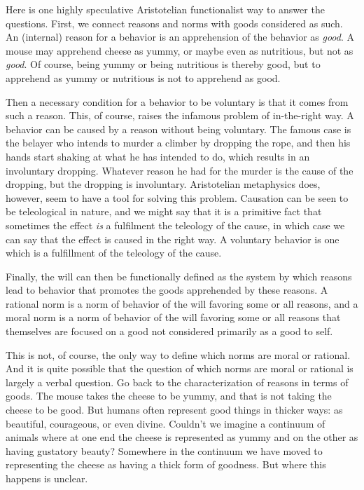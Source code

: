 Here is one highly speculative Aristotelian functionalist way to answer the questions. First, we connect reasons and norms with goods
considered as such. An (internal) reason 
for a behavior is an apprehension of the behavior as \textit{good}. A mouse may apprehend cheese as yummy, or maybe even as nutritious, 
but not as \textit{good}. Of course, being yummy or being nutritious is thereby good, but to apprehend as yummy or nutritious is not 
to apprehend as good. 

Then a necessary condition for a behavior to be voluntary is that it 
comes from such a reason. This, of course, raises the infamous problem of in-the-right way. A behavior can be caused by a reason
without being voluntary. The famous case is the belayer who intends to murder a climber by dropping the rope, and then
his hands start shaking at what he has intended to do, which results in an involuntary dropping. Whatever reason he had
for the murder is the cause of the dropping, but the dropping is involuntary. Aristotelian metaphysics does, however, seem
to have a tool for solving this problem. Causation can be seen to be teleological in nature, and we might say that it is 
a primitive fact that sometimes the effect \textit{is} a fulfilment the teleology of the cause, in which case we can say that the effect 
is caused in the right way. A voluntary behavior is one which is a fulfillment of the teleology of the cause.

Finally, the will can then be functionally defined as the system by which reasons lead to behavior that promotes 
the goods apprehended by these reasons. A rational norm is a norm of behavior
of the will favoring some or all reasons, and a moral norm is a norm of behavior of the will favoring some or all reasons that themselves 
are focused on  a good not considered primarily as a good to self. 

This is not, of course, the only way to define which norms are moral or rational. And it is quite possible that the question of which
norms are moral or rational is largely a verbal question. Go back to the characterization of reasons in terms of goods. The mouse takes
the cheese to be yummy, and that is not taking the cheese to be good. But humans often represent good things in thicker ways: as
beautiful, courageous, or even divine. Couldn't we imagine a continuum of animals where at one end the cheese is represented as 
yummy and on the other as having gustatory beauty? Somewhere in the continuum we have moved to representing the cheese as having a 
thick form of goodness. But where this happens is unclear. 

